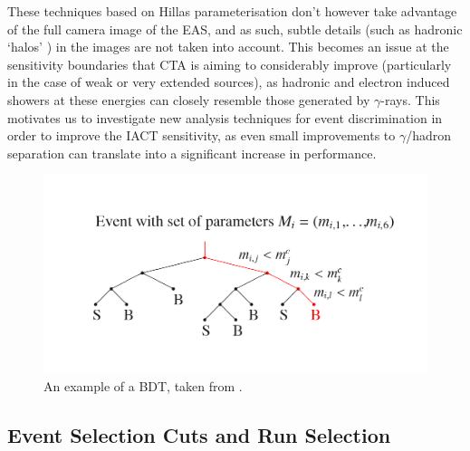 These techniques based on Hillas parameterisation don't however take advantage of the full camera image of the EAS, and as such, subtle details (such as hadronic `halos' \cite{model++}) in the images are not taken into account. This becomes an issue at the sensitivity boundaries that CTA is aiming to considerably improve (particularly in the case of weak or very extended sources), as hadronic and electron induced showers at these energies can closely resemble those generated by $\gamma$-rays. This motivates us to investigate new analysis techniques for event discrimination in order to improve the IACT sensitivity, as even small improvements to $\gamma$/hadron separation can translate into a significant increase in performance.

\begin{figure}[ht] 
        \centering \includegraphics[width=\columnwidth]{figures/forest_picture.png}
        \caption{
                \label{fig:bdtstruct} %
                An example of a BDT, taken from \cite{hessbdt}.
        }
\end{figure}

\subsection{Event Selection Cuts and Run Selection}

